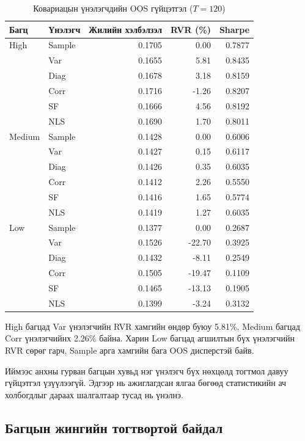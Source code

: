 \begin{table}[htbp]
	\centering
	\caption{Ковариацын үнэлэгчдийн OOS гүйцэтгэл ($T=120$)}
	\label{tab:oos_performance}
	\small
	\begin{tabular}{llrrr}
		\hline
		Багц & Үнэлэгч &
		Жилийн хэлбэлзэл & RVR (\%) & Sharpe\\
		\hline
		High & Sample & 0.1705 & 0.00 & 0.7877\\
		& Var  & 0.1655 & 5.81 & 0.8435\\
		& Diag & 0.1678 & 3.18 & 0.8159\\
		& Corr & 0.1716 & -1.26 & 0.8207\\
		& SF   & 0.1666 & 4.56 & 0.8192\\
		& NLS  & 0.1690 & 1.70 & 0.8011\\
		\hline
		Medium & Sample & 0.1428 & 0.00 & 0.6006\\
		& Var  & 0.1427 & 0.15 & 0.6117\\
		& Diag & 0.1426 & 0.35 & 0.6035\\
		& Corr & 0.1412 & 2.26 & 0.5550\\
		& SF   & 0.1416 & 1.65 & 0.5774\\
		& NLS  & 0.1419 & 1.27 & 0.6035\\
		\hline
		Low & Sample & 0.1377 & 0.00 & 0.2687\\
		& Var  & 0.1526 & -22.70 & 0.3925\\
		& Diag & 0.1432 & -8.11 & 0.2549\\
		& Corr & 0.1505 & -19.47 & 0.1109\\
		& SF   & 0.1465 & -13.13 & 0.1905\\
		& NLS  & 0.1399 & -3.24 & 0.3132\\
		\hline
	\end{tabular}
\end{table}

High багцад Var үнэлэгчийн RVR хамгийн
өндөр буюу 5.81\%, Medium багцад Corr
үнэлэгчийнх 2.26\% байна. Харин Low
багцад агшилтын бүх үнэлэгчийн RVR
сөрөг гарч, Sample арга хамгийн бага
OOS дисперстэй байв.

Иймээс анхны гурван багцын хувьд нэг
үнэлэгч бүх нөхцөлд тогтмол давуу
гүйцэтгэл үзүүлээгүй. Эдгээр нь ажиглагдсан
ялгаа бөгөөд статистикийн ач холбогдлыг
дараах шалгалтаар тусад нь үнэлнэ.

\subsection{Багцын жингийн тогтвортой байдал}
\label{subsec:portfolio_stability}

